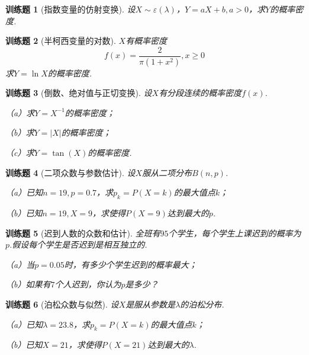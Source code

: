 \documentclass[UTF8,12pt,a4paper,fontset=fandol]{ctexbook}
\newtheorem{exercise}{训练题}[section]
\begin{document}
\begin{exercise}[指数变量的仿射变换]\label{q:Y3.18}
设$X\sim \varepsilon(\lambda)$，$Y=aX+b,a>0$，求$Y$的概率密度.\par{}\end{exercise}

\begin{exercise}[半柯西变量的对数]\label{q:Y3.19}
$X$有概率密度
\[f(x)=\frac{2}{\pi(1+x^2)},x\geqslant 0\]
求$Y=\ln X$的概率密度.\par{}\end{exercise}

\begin{exercise}[倒数、绝对值与正切变换]\label{q:Y3.20}
设$X$有分段连续的概率密度$f(x)$.

（a）求$Y=X^{-1}$的概率密度；

（b）求$Y=|X|$的概率密度；

（c）求$Y=\tan(X)$的概率密度.\par{}\end{exercise}

\begin{exercise}[二项众数与参数估计]\label{q:Y3.21}
设$X$服从二项分布$B(n,p)$.

（a）已知$n=19,p=0.7$，求$p_k=P(X=k)$的最大值点$k$；

（b）已知$n=19,X=9$，求使得$P(X=9)$达到最大的$p$.\par{}\end{exercise}

\begin{exercise}[迟到人数的众数和估计]\label{q:Y3.22}
全班有$95$个学生，每个学生上课迟到的概率为$p$.假设每个学生是否迟到是相互独立的.

（a）当$p=0.05$时，有多少个学生迟到的概率最大；

（b）如果有$7$个人迟到，你认为$p$是多少？\par{}\end{exercise}

\begin{exercise}[泊松众数与似然]\label{q:Y3.23}
设$X$是服从参数是$\lambda$的泊松分布.

（a）已知$\lambda=23.8$，求$p_k=P(X=k)$的最大值点$k$；

（b）已知$X=21$，求使得$P(X=21)$达到最大的$\lambda$.\par{}\end{exercise}
\end{document}
